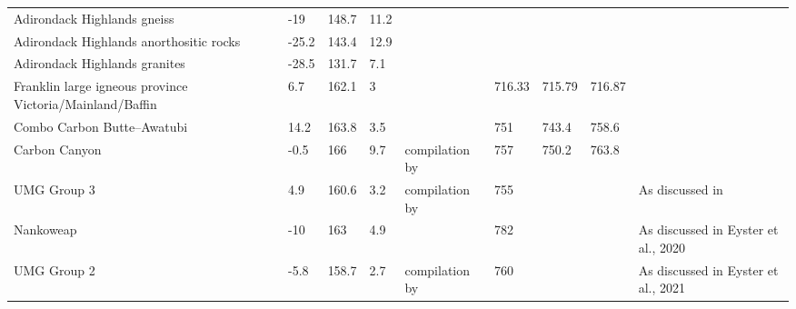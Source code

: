 \begin{table}
\begin{tabular}{p{4cm}lllp{4cm}p{1.3cm}p{1.2cm}p{1.2cm}p{4cm}}
Adirondack Highlands gneiss                                & -19      & 148.7    & 11.2 & \cite{Brown2012a}                                                &            &          &          &                                                     \\
Adirondack Highlands anorthositic rocks                    & -25.2    & 143.4    & 12.9 & \cite{Brown2012a}                                                &            &          &          &                                                     \\
Adirondack Highlands granites                              & -28.5    & 131.7    & 7.1  & \cite{Brown2012a}                                                &            &          &          &                                                     \\
Franklin large igneous province   Victoria/Mainland/Baffin & 6.7      & 162.1    & 3    & \cite{Denyszyn2009a}                                                   & 716.33     & 715.79   & 716.87   &                                                     \\
Combo Carbon Butte–Awatubi                                 & 14.2     & 163.8    & 3.5  & \cite{Eyster2019a}                                                   & 751        & 743.4    & 758.6    &                                                     \\
Carbon Canyon                                              & -0.5     & 166      & 9.7  & compilation by \cite{Eyster2019a}                                    & 757        & 750.2    & 763.8    &                                                     \\
UMG Group 3                                                & 4.9      & 160.6    & 3.2  & compilation by \cite{Eyster2019a}                                    & 755        &          &          & As discussed in \cite{Eyster2019a}                \\
Nankoweap                                                  & -10      & 163      & 4.9  & \cite{Weil2003a}                                                     & 782        &          &          & As discussed in Eyster et al., 2020                 \\
UMG Group 2                                                & -5.8     & 158.7    & 2.7  & compilation by \cite{Eyster2019a}                                    & 760        &          &          & As discussed in Eyster et al., 2021                 \\

\end{tabular}
\end{table}

